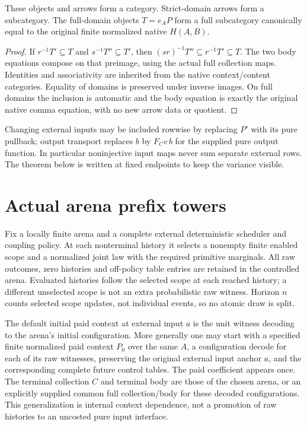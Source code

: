 \documentclass{article}
\begin{document}
\begin{proposition}
These objects and arrows form a category. Strict-domain arrows form a
subcategory. The full-domain objects $T=e_AP$ form a full subcategory
canonically equal to the original finite normalized native $H(A,B)$.
\end{proposition}
\begin{proof}
If $r^{-1}T'\subseteq T$ and $s^{-1}T''\subseteq T'$, then
$(sr)^{-1}T''\subseteq r^{-1}T'\subseteq T$. The two body equations compose
on that preimage, using the actual full collection maps. Identities and
associativity are inherited from the native context/content categories.
Equality of domains is preserved under inverse images. On full domains the
inclusion is automatic and the body equation is exactly the original native
comma equation, with no new arrow data or quotient.
\end{proof}
Changing external inputs may be included rowwise by replacing $P'$ with its
pure pullback; output transport replaces $b$ by $F_Cv\,b$ for the supplied
pure output function. In particular noninjective input maps never sum
separate external rows. The theorem below is written at fixed endpoints to
keep the variance visible.

\section{Actual arena prefix towers}
Fix a locally finite arena and a complete external deterministic scheduler
and coupling policy. At each nonterminal history it selects a nonempty
finite enabled scope and a normalized joint law with the required primitive
marginals. All raw outcomes, zero histories and off-policy table entries are
retained in the controlled arena. Evaluated histories follow the selected
scope at each reached history; a different unselected scope is not an extra
probabilistic raw witness. Horizon $n$ counts selected scope updates, not
individual events, so no atomic draw is split.

The default initial paid context at external input $a$ is the unit witness
decoding to the arena's initial configuration. More generally one may start
with a specified finite normalized paid context $P_0$ over the same $A$, a
configuration decode for each of its raw witnesses, preserving the original
external input anchor $a$, and the corresponding
complete future control tables. The paid coefficient appears once. The
terminal collection $C$ and terminal body are those of the chosen arena,
or an explicitly supplied common full collection/body for these decoded
configurations. This generalization is internal context dependence, not a
promotion of raw histories to an uncosted pure input interface.
\end{document}
